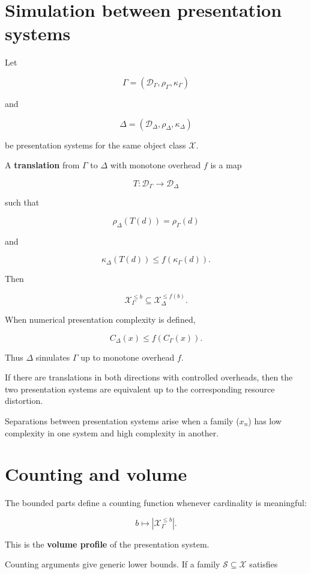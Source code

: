 \documentclass[11pt]{article}
\begin{document}
\section{Simulation between presentation systems}

Let

\[
\Gamma=(\mathcal D_\Gamma,\rho_\Gamma,\kappa_\Gamma)
\]

and

\[
\Delta=(\mathcal D_\Delta,\rho_\Delta,\kappa_\Delta)
\]

be presentation systems for the same object class \(\mathcal X\).

A \textbf{translation} from \(\Gamma\) to \(\Delta\) with monotone overhead \(f\) is a map

\[
T:\mathcal D_\Gamma\to\mathcal D_\Delta
\]

such that

\[
\rho_\Delta(T(d))=\rho_\Gamma(d)
\]

and

\[
\kappa_\Delta(T(d))\leq f(\kappa_\Gamma(d)).
\]

Then

\[
\mathcal X_\Gamma^{\leq b}
\subseteq
\mathcal X_\Delta^{\leq f(b)}.
\]

When numerical presentation complexity is defined,

\[
C_\Delta(x)
\leq
f(C_\Gamma(x)).
\]

Thus \(\Delta\) simulates \(\Gamma\) up to monotone overhead \(f\).

If there are translations in both directions with controlled overheads, then the two presentation systems are equivalent up to the corresponding resource distortion.

Separations between presentation systems arise when a family (\(x_n\)) has low complexity in one system and high complexity in another.


\section{Counting and volume}

The bounded parts define a counting function whenever cardinality is meaningful:

\[
b\mapsto |\mathcal X_\Gamma^{\leq b}|.
\]

This is the \textbf{volume profile} of the presentation system.

Counting arguments give generic lower bounds. If a family \(\mathcal S\subseteq\mathcal X\) satisfies
\end{document}
